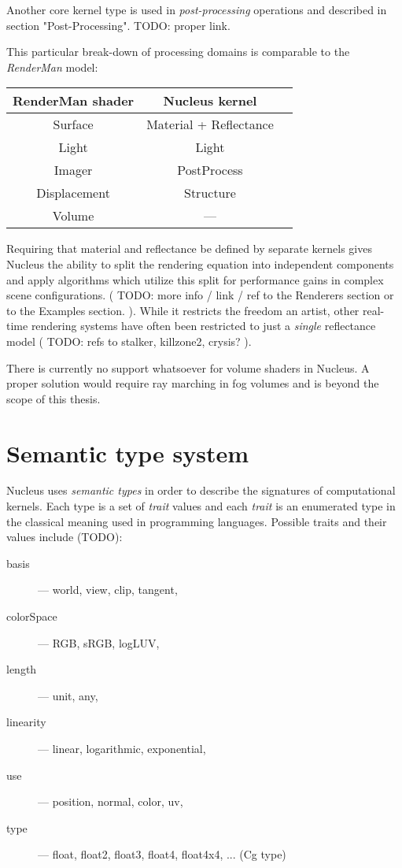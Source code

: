 Another core kernel type is used in \emph{post-processing} operations and described in section "Post-Processing". TODO: proper link.

This particular break-down of processing domains is comparable to the \emph{RenderMan} model:

\begin{center}
\begin{tabular}{ | c | c | c | }
\hline
RenderMan shader & Nucleus kernel \\
\hline
Surface & Material + Reflectance \\
Light & Light \\
Imager & PostProcess \\
Displacement & Structure \\
Volume & --- \\
\hline
\end{tabular}
\end{center}


Requiring that material and reflectance be defined by separate kernels gives Nucleus the ability to split the rendering equation into independent components and apply algorithms which utilize this split for performance gains in complex scene configurations. ( TODO: more info / link / ref to the Renderers section or to the Examples section. ). While it restricts the freedom an artist, other real-time rendering systems have often been restricted to just a \emph{single} reflectance model ( TODO: refs to stalker, killzone2, crysis? ).

There is currently no support whatsoever for volume shaders in Nucleus. A proper solution would require ray marching in fog volumes and is beyond the scope of this thesis.

\section{Semantic type system}

Nucleus uses \emph{semantic types} in order to describe the signatures of computational kernels. Each type is a set of \emph{trait} values and each \emph{trait} is an enumerated type in the classical meaning used in programming languages. Possible traits and their values include (TODO):
\begin{description}
\item[basis] --- world, view, clip, tangent,
\item[colorSpace] --- RGB, sRGB, logLUV,
\item[length] --- unit, any,
\item[linearity] --- linear, logarithmic, exponential,
\item[use] --- position, normal, color, uv,
\item[type] --- float, float2, float3, float4, float4x4, ... (Cg type)
\end{description}

